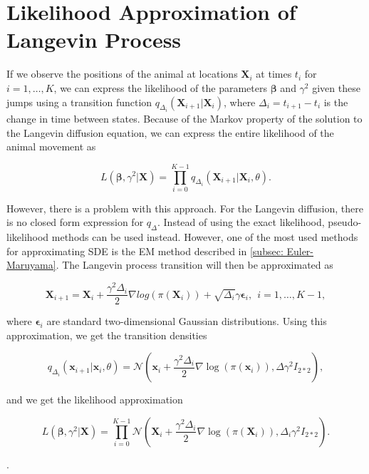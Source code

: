\section{Likelihood Approximation of Langevin Process}
\label{sec: Likelihood Approximation of the Langevin Process}
If we observe the positions of the animal at locations $\textbf{X}_i$ at times $t_i$ for $i=1,\dots , K$, we can express the likelihood of the parameters $\bm{\beta}$ and $\gamma^2$ given these jumps using a transition function $q_{\Delta_i}(\textbf{X}_{i+1} | \textbf{X}_i)$, where $\Delta_i = t_{i+1} - t_i$ is the change in time between states. Because of the Markov property of the solution to the Langevin diffusion equation, we can express the entire likelihood of the animal movement as

\begin{equation}
    L(\bm{\beta}, \gamma^2 | \textbf{X}) = \prod_{i=0}^{K-1} q_{\Delta_i}(\textbf{X}_{i+1} | \textbf{X}_i, \theta).
    \label{eq: Langevin likelihood}
\end{equation}

However, there is a problem with this approach. For the Langevin diffusion, there is no closed form expression for $q_\Delta$\parencite{gloaguen_stochastic_2018}. Instead of using the exact likelihood, pseudo-likelihood methods can be used instead. However, one of the most used methods for approximating SDE is the EM method described in \ref{subsec: Euler-Maruyama}. The Langevin process transition will then be approximated as

$$
    \textbf{X}_{i+1} = \textbf{X}_i + \frac{\gamma^2 \Delta_i}{2}\nabla log(\pi(\textbf{X}_i)) + \sqrt{\Delta_i}\gamma \bm{\epsilon}_i, \ \ i = 1,\dots , K-1,
$$

where $\bm{\epsilon}_i$ are standard two-dimensional Gaussian distributions. Using this approximation, we get the transition densities 

$$
q_{\Delta_i}(\textbf{x}_{i+1} | \textbf{x}_i, \theta) = \mathcal{N}(\textbf{x}_i + \frac{\gamma^2 \Delta_i}{2}\nabla \log(\pi(\textbf{x}_i)), \Delta \gamma^2 I_{2*2}),
$$

and we get the likelihood approximation

$$
L(\bm{\beta}, \gamma^2 | \textbf{X}) = \prod_{i=0}^{K-1} \mathcal{N}(\textbf{X}_i + \frac{\gamma^2 \Delta_i}{2}\nabla \log(\pi(\textbf{X}_i)), \Delta_i \gamma^2 I_{2*2}).
$$

\parencite{iacus_simulation_2008}.






